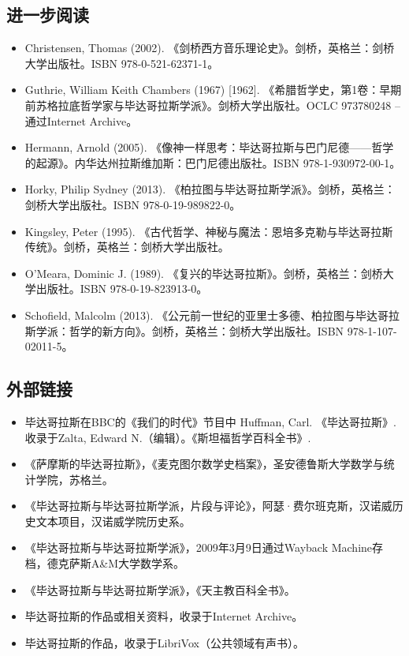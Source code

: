 \subsection{进一步阅读}
\begin{itemize}
\item Christensen, Thomas (2002). 《剑桥西方音乐理论史》。剑桥，英格兰：剑桥大学出版社。ISBN 978-0-521-62371-1。  
\item Guthrie, William Keith Chambers (1967) [1962]. 《希腊哲学史，第1卷：早期前苏格拉底哲学家与毕达哥拉斯学派》。剑桥大学出版社。OCLC 973780248 – 通过Internet Archive。  
\item Hermann, Arnold (2005). 《像神一样思考：毕达哥拉斯与巴门尼德——哲学的起源》。内华达州拉斯维加斯：巴门尼德出版社。ISBN 978-1-930972-00-1。  
\item Horky, Philip Sydney (2013). 《柏拉图与毕达哥拉斯学派》。剑桥，英格兰：剑桥大学出版社。ISBN 978-0-19-989822-0。  
\item Kingsley, Peter (1995). 《古代哲学、神秘与魔法：恩培多克勒与毕达哥拉斯传统》。剑桥，英格兰：剑桥大学出版社。  
\item O'Meara, Dominic J. (1989). 《复兴的毕达哥拉斯》。剑桥，英格兰：剑桥大学出版社。ISBN 978-0-19-823913-0。  
\item Schofield, Malcolm (2013). 《公元前一世纪的亚里士多德、柏拉图与毕达哥拉斯学派：哲学的新方向》。剑桥，英格兰：剑桥大学出版社。ISBN 978-1-107-02011-5。
\end{itemize}
\subsection{外部链接}
\begin{itemize}
\item 毕达哥拉斯在BBC的《我们的时代》节目中  
Huffman, Carl. 《毕达哥拉斯》. 收录于Zalta, Edward N.（编辑）。《斯坦福哲学百科全书》.  
\item 《萨摩斯的毕达哥拉斯》，《麦克图尔数学史档案》，圣安德鲁斯大学数学与统计学院，苏格兰。  
\item 《毕达哥拉斯与毕达哥拉斯学派，片段与评论》，阿瑟·费尔班克斯，汉诺威历史文本项目，汉诺威学院历史系。  
\item 《毕达哥拉斯与毕达哥拉斯学派》，2009年3月9日通过Wayback Machine存档，德克萨斯A&M大学数学系。  
\item 《毕达哥拉斯与毕达哥拉斯学派》，《天主教百科全书》。  
\item 毕达哥拉斯的作品或相关资料，收录于Internet Archive。  
\item 毕达哥拉斯的作品，收录于LibriVox（公共领域有声书）。  
\end{itemize}
































